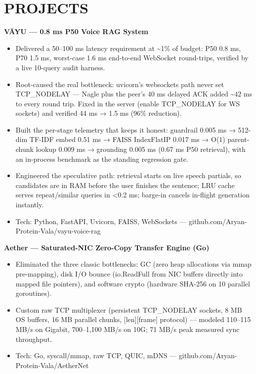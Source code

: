 \documentclass[9pt]{article}
\begin{document}
\section*{PROJECTS}
\textbf{VĀYU  ---  0.8 ms P50 Voice RAG System}
\vspace{1pt}
\begin{itemize}[leftmargin=11pt,itemsep=0pt,topsep=1pt,parsep=0pt]
\item Delivered a 50–100 ms latency requirement at \textasciitilde{}1\% of budget: P50 0.8 ms, P70 1.5 ms, worst-case 1.6 ms end-to-end WebSocket round-trips, verified by a live 10-query audit harness.
\item Root-caused the real bottleneck: uvicorn's websockets path never set TCP\_NODELAY  ---  Nagle plus the peer's 40 ms delayed ACK added \textasciitilde{}42 ms to every round trip. Fixed in the server (enable TCP\_NODELAY for WS sockets) and verified 44 ms → 1.5 ms (96\% reduction).
\item Built the per-stage telemetry that keeps it honest: guardrail 0.005 ms → 512-dim TF-IDF embed 0.51 ms → FAISS IndexFlatIP 0.017 ms → O(1) parent-chunk lookup 0.009 ms → grounding 0.005 ms (0.67 ms P50 retrieval), with an in-process benchmark as the standing regression gate.
\item Engineered the speculative path: retrieval starts on live speech partials, so candidates are in RAM before the user finishes the sentence; LRU cache serves repeat/similar queries in <0.2 ms; barge-in cancels in-flight generation instantly.
\item Tech: Python, FastAPI, Uvicorn, FAISS, WebSockets  ---  github.com/Aryan-Protein-Vala/vayu-voice-rag
\end{itemize}
\textbf{Aether  ---  Saturated-NIC Zero-Copy Transfer Engine (Go)}
\vspace{1pt}
\begin{itemize}[leftmargin=11pt,itemsep=0pt,topsep=1pt,parsep=0pt]
\item Eliminated the three classic bottlenecks: GC (zero heap allocations via mmap pre-mapping), disk I/O bounce (io.ReadFull from NIC buffers directly into mapped file pointers), and software crypto (hardware SHA-256 on 10 parallel goroutines).
\item Custom raw TCP multiplexer (persistent TCP\_NODELAY sockets, 8 MB OS buffers, 16 MB parallel chunks, [len][frame] protocol)  ---  modeled 110–115 MB/s on Gigabit, 700–1,100 MB/s on 10G; 71 MB/s peak measured sync throughput.
\item Tech: Go, syscall/mmap, raw TCP, QUIC, mDNS  ---  github.com/Aryan-Protein-Vala/AetherNet
\end{itemize}
\end{document}
